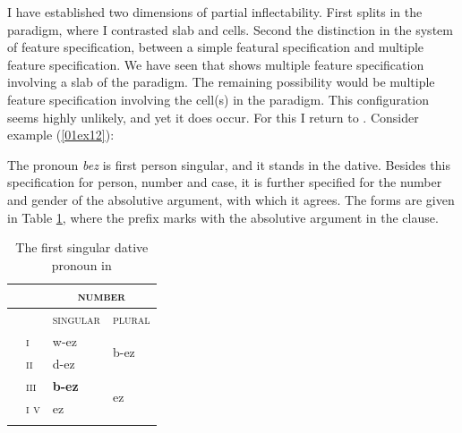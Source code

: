 \documentclass[output=paper,colorlinks,citecolor=brown]{langscibook}
\begin{document}
I have established two dimensions of partial inflectability. First splits in the paradigm, where I contrasted slab and cells. Second the distinction in the system of feature specification, between a simple featural specification and multiple feature specification. We have seen that  shows multiple feature specification involving a slab of the paradigm. The remaining possibility would be multiple feature specification involving the cell(s) in the paradigm. This configuration seems highly unlikely, and yet it does occur. For this I return to . Consider example (\ref{01ex12}):


The pronoun \textit{bez} is first person singular, and it stands in the dative. Besides this specification for person, number and case, it is further specified for the number and gender of the absolutive argument, with which it agrees. The forms are given in Table \ref{01tab8}, where the prefix marks  with the absolutive argument in the clause.

\begin{table}[H]
	\centering
	\caption{The first singular dative pronoun in }
	\label{01tab8}
	\begin{tabularx}{0.4\textwidth}{llll}
		\lsptoprule
		& & \multicolumn{2}{c}{\textsc{number}} \\
		\midrule
		& & \textsc{singular} & \textsc{plural} \\
		\midrule
		\multirow{4}{*}{\rotatebox{90}{\textsc{gender}}} & \textsc{i} & w-ez & \multirow{2}{*}{b-ez} \\
		& \textsc{ii} & d-ez & \\
		& \textsc{iii} & \textbf{b-ez} & \multirow{2}{*}{ez} \\
		& \textsc{i} \newline \textsc{v} & ez & \\
		\lspbottomrule
	\end{tabularx}
\end{table}
\end{document}
